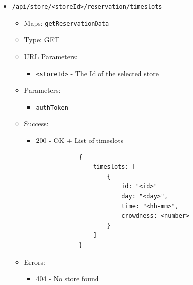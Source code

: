 \begin{itemize}
    \item \texttt{/api/store/<storeId>/reservation/timeslots}
    \begin{itemize}
        \item Maps: \texttt{getReservationData}
        \item Type: GET
        \item URL Parameters:
        \begin{itemize}
            \item \texttt{<storeId>} - The Id of the selected store
        \end{itemize}
        \item Parameters:
        \begin{itemize}
            \item \texttt{authToken}
        \end{itemize}
        \item Success:
        \begin{itemize}
            \item 200 - OK + List of timeslots
            \begin{lstlisting}
            {
                timeslots: [
                    {
                        id: "<id>"
                        day: "<day>",
                        time: "<hh-mm>",
                        crowdness: <number>
                    }
                ]
            }
            \end{lstlisting}
        \end{itemize}
        \item Errors:
        \begin{itemize}
            \item 404 - No store found
        \end{itemize}
    \end{itemize}


\end{itemize}
